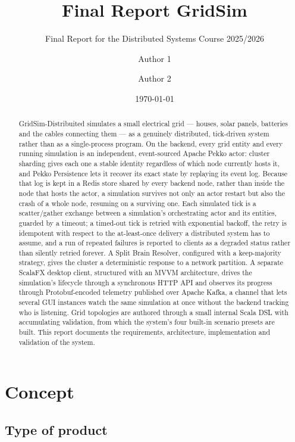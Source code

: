 \documentclass{scrreprt}
\title{\LARGE
    Final Report GridSim
}
\subtitle{Final Report for the Distributed Systems Course 2025/2026}
\author{
    Author 1 \\ \emailaddr{matteo.bambini@studio.unibo.it}
    \and
    Author 2 \\ \emailaddr{michele.nardini2@studio.unibo.it}
}
\date{\today}
\begin{document}
\maketitle

\begin{abstract}
GridSim-Distribuited simulates a small electrical grid --- houses, solar panels, batteries and
the cables connecting them --- as a genuinely distributed, tick-driven system rather than as a
single-process program. On the backend, every grid entity and every running simulation is an
independent, event-sourced Apache Pekko actor: cluster sharding gives each one a stable identity
regardless of which node currently hosts it, and Pekko Persistence lets it recover its exact state
by replaying its event log. Because that log is kept in a Redis store shared by every backend
node, rather than inside the node that hosts the actor, a simulation survives not only an actor
restart but also the crash of a whole node, resuming on a surviving one. Each simulated tick is a scatter/gather exchange
between a simulation's orchestrating actor and its entities, guarded by a timeout; a timed-out
tick is retried with exponential backoff, the retry is idempotent with respect to the
at-least-once delivery a distributed system has to assume, and a run of repeated failures is
reported to clients as a degraded status rather than silently retried forever. A Split Brain
Resolver, configured with a keep-majority strategy, gives the cluster a deterministic response to
a network partition. A separate ScalaFX desktop client, structured with an MVVM architecture,
drives the simulation's lifecycle through a synchronous HTTP API and observes its progress through
Protobuf-encoded telemetry published over Apache Kafka, a channel that lets several GUI instances
watch the same simulation at once without the backend tracking who is listening. Grid topologies
are authored through a small internal Scala DSL with accumulating validation, from which the
system's four built-in scenario presets are built. This report documents the requirements,
architecture, implementation and validation of the system.
\end{abstract}

\chapter{Concept}\label{concept}

\section{Type of product}
\end{document}

